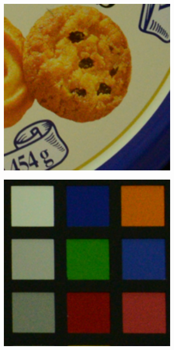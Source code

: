 \begin{figure}
\begin{subfigure}[t]{0.19\textwidth}
    \end{subfigure}
    \hfill
    \begin{subfigure}[t]{0.19\textwidth}
        \centering
        \includegraphics[width=1\textwidth]{images/mcwnnm/resize_d600_iso3200_2_real.png}
    \end{subfigure}
\hfill
    \begin{subfigure}[t]{0.19\textwidth}
        \centering
        \includegraphics[width=1\textwidth]{images/mcwnnm/resize_d600_iso3200_3_real.png}

\end{subfigure}
\end{figure}
